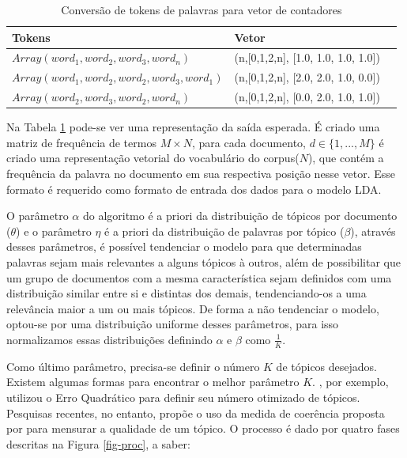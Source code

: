 \documentclass[12pt,a4paper]{article}
\begin{document}
\begin{table}[H]
  \centering
  \begin{tabular}{l l l}
  Tokens		&Vetor &\\
  \hline
  $Array(word_1, word_2, word_3, word_n)$						&(n,[0,1,2,n], [1.0, 1.0, 1.0, 1.0]) &\\
  $Array(word_1, word_2, word_2, word_3, word_1)$				&(n,[0,1,2,n], [2.0, 2.0, 1.0, 0.0]) &\\
  $Array(word_2, word_3, word_2, word_n)$						&(n,[0,1,2,n], [0.0, 2.0, 1.0, 1.0]) &\\
  \hline
  \end{tabular}
  
  \caption{Conversão de tokens de palavras para vetor de contadores}
  \label{tab-voc}
\end{table}


Na Tabela \ref{tab-voc} pode-se ver uma representação da saída esperada. É criado uma matriz de frequência de termos $M \times N$, para cada documento,
 $d \in \{1,. . . , M\}$ é criado uma representação vetorial do vocabulário do corpus($N$), que contém a frequência da palavra no documento em sua respectiva posição nesse vetor.
 Esse formato é requerido como formato de entrada dos dados para o modelo LDA.

O parâmetro $\alpha$ do algoritmo é a priori da distribuição de tópicos por documento ($\theta$) e o parâmetro $\eta$ é a priori da distribuição de palavras por tópico ($\beta$),
 através desses parâmetros, é possível tendenciar o modelo para que determinadas palavras sejam mais relevantes a alguns tópicos à outros,
 além de possibilitar que um grupo de documentos com a mesma característica sejam definidos com uma distribuição similar entre si e distintas dos demais,
 tendenciando-os a uma relevância maior a um ou mais tópicos. De forma a não tendenciar o modelo, optou-se por uma distribuição uniforme desses parâmetros,
 para isso normalizamos essas distribuições definindo $\alpha$ e $\beta$ como $\frac{1}{K}$.

Como último parâmetro, precisa-se definir o número $K$ de tópicos desejados. Existem algumas formas para encontrar o melhor parâmetro $K$.  , por exemplo, utilizou o Erro Quadrático para definir seu número otimizado de tópicos. Pesquisas recentes, no entanto,
 propõe o uso da medida de coerência proposta por  para mensurar a qualidade de um tópico. O processo é dado por quatro fases descritas na Figura \ref{fig-proc}, a saber:
\end{document}
